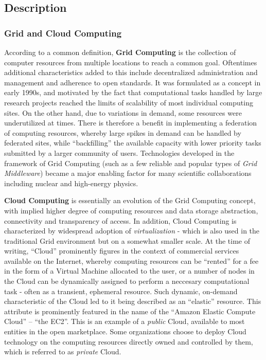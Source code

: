 \subsection{Description}

\subsubsection{Grid and Cloud Computing}
\label{cloud}
According to a common definition, \textbf{Grid Computing} is the collection of computer resources from multiple locations to reach a common goal. Oftentimes additional
characteristics added to this include decentralized administration and management and adherence to open standards. It was formulated as a concept in early 1990s,
and motivated by the fact that computational tasks handled by large research projects reached the limits of scalability of most individual computing sites.
On the other hand, due to variations in demand, some resources were underutilized at times. There is therefore a benefit in implementing a federation of computing
resources, whereby large spikes in demand can be handled by federated sites, while ``backfilling'' the available capacity with lower priority tasks submitted by a
larger community of users. Technologies developed in the framework of Grid Computing (such as a few reliable and popular types of \textit{Grid Middleware})
became a major enabling factor for many scientific collaborations including nuclear and high-energy physics.

\textbf{Cloud Computing} is essentially an evolution of the Grid Computing concept, with implied higher degree of computing resources and data
storage abstraction, connectivity and transparency of access. In addition, Cloud Computing is characterized by widespread adoption of \textit{virtualization} - which is
also used in the traditional Grid environment but on a somewhat smaller scale. At the time of writing, ``Cloud'' prominently figures in the context of commercial services available on
the Internet, whereby computing resources can be ``rented'' for a fee in the form of a Virtual Machine allocated to the user, or a  number of nodes in the Cloud can
be dynamically assigned to perform a neccesary computational task - often as a transient, ephemeral resource. Such dynamic, on-demand characteristic of the
Cloud led to it being described as an ``elastic'' resource. This attribute is prominently featured in the name of the ``Amazon Elastic Compute Cloud'' -- ``the EC2''.
This is an example of a \textit{public} Cloud, available to most entities in the open marketplace. Some organizations choose to deploy Cloud technology on the
computing resources directly owned and controlled by them, which is referred to as \textit{private} Cloud.

